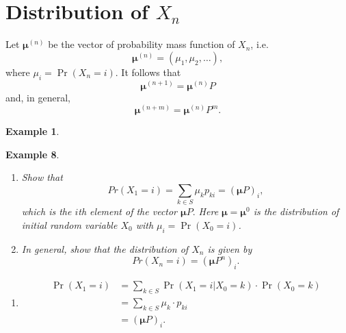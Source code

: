 \documentclass[
]{book}
\providecommand{\tightlist}{%
  \setlength{\itemsep}{0pt}\setlength{\parskip}{0pt}}
\theoremstyle{definition}
\theoremstyle{definition}
\newtheorem{example}{Example}[chapter]
\theoremstyle{definition}
\theoremstyle{definition}
\theoremstyle{remark}
\begin{document}
\hypertarget{distribution-of-x_n}{%
\section{\texorpdfstring{Distribution of \(X_n\)}{Distribution of X\_n}}\label{distribution-of-x_n}}

Let \(\boldsymbol{\mu}^{(n)}\) be the vector of probability mass function
of \(X_n\), i.e.~\[\boldsymbol{\mu}^{(n)} = (\mu_1, \mu_2, \ldots ),\]
where \(\mu_i = \Pr(X_n = i)\). It follows that
\[\boldsymbol{\mu}^{(n+1)} = \boldsymbol{\mu}^{(n)} P\] and, in general,
\[\boldsymbol{\mu}^{(n+m)} = \boldsymbol{\mu}^{(n)} P^m.\]

\begin{example}
\protect\hypertarget{exm:unlabeled-div-18}{}\label{exm:unlabeled-div-18}

\textbf{Example 8}.

\begin{enumerate}
\def\labelenumi{\arabic{enumi}.}
\item
  \emph{Show that
  \[Pr(X_1 = i) = \sum_{k \in S} \mu_k p_{ki} = ( \boldsymbol{\mu} P)_i,\]
  which is the \(i\)th element of the vector \(\boldsymbol{\mu} P.\) Here
  \(\boldsymbol{\mu} = \boldsymbol{\mu}^{0}\) is the distribution of
  initial random variable \(X_0\) with \(\mu_i = \Pr(X_0 = i)\).}
\item
  \emph{In general, show that the distribution of \(X_n\) is given by
  \[Pr(X_n = i) =  ( \boldsymbol{\mu} P^n)_i.\]}
\end{enumerate}

\end{example}

\begin{enumerate}
\def\labelenumi{\arabic{enumi}.}
\tightlist
\item
  \[\begin{aligned}
      \Pr(X_1 = i) &= \sum_{k \in S} \Pr(X_1 = i | X_0 = k) \cdot \Pr(X_0 = k) \\
      &=  \sum_{k \in S} \mu_k \cdot p_{ki} \\
      &= ( \boldsymbol{\mu} P)_i.\end{aligned}\]
\end{enumerate}
\end{document}
